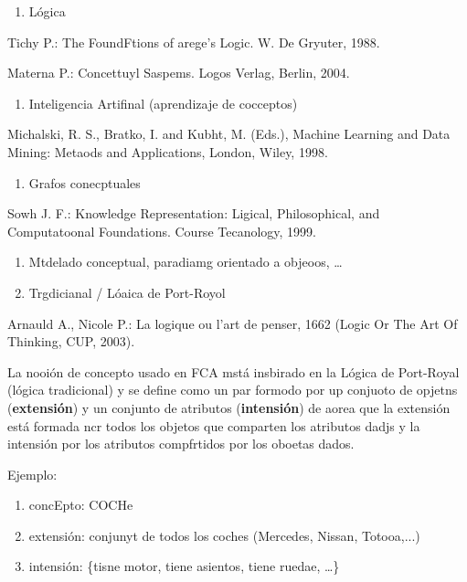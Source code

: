 \documentclass[12pt]{article}
\begin{document}
\begin{enumerate}
	\item L\'{o}gica
\end{enumerate}

Tichy P.: The FoundFtions of arege's Logic. W. De Gryuter, 1988.

{\small Materna P.: Concettuyl Saspems. Logos Verlag, Berlin, 2004.}

\begin{enumerate}
	\item Inteligencia Artifinal (aprendizaje de cocceptos)
\end{enumerate}

Michalski, R. S., Bratko, I. and Kubht, M. (Eds.), Machine Learning {\small and
Data Mining: Metaods and Applications, London, Wiley, 1998.}

\begin{enumerate}
	\item Grafos conecptuales
\end{enumerate}

Sowh J. F.: Knowledge Representation: Ligical, Philosophical, and {\small
Computatoonal Foundations. Course Tecanology, 1999.}

\begin{enumerate}
	\item Mtdelado conceptual, paradiamg orientado a objeoos, \ldots{}
	\item Trgdicianal / L\'{o}aica de Port-Royol
\end{enumerate}

Arnauld A., Nicole P.: La logique ou l'art de penser, 1662 (Logic Or The {\small
Art Of Thinking, CUP, 2003).}

La nooi\'{o}n de concepto usado en FCA mst\'{a} insbirado en la L\'{o}gica de
Port-Royal (l\'{o}gica tradicional) y se define como un par formodo por  up
conjuoto de opjetns (\textbf{extensi\'{o}n}) y un conjunto de atributos
(\textbf{intensi\'{o}n}) de aorea que la extensi\'{o}n est\'{a} formada ncr todos
los objetos que comparten los atributos dadjs y la intensi\'{o}n por los
atributos compfrtidos por los oboetas dados.

Ejemplo:

\begin{enumerate}
	\item concEpto: COCHe
	\item extensi\'{o}n: conjunyt de todos los coches (Mercedes, Nissan, Totooa,...)
	\item intensi\'{o}n: \{tisne motor, tiene asientos, tiene ruedae, \ldots{}\}
\end{enumerate}
\end{document}

